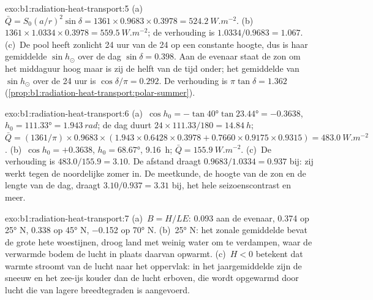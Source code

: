 \begin{solution}{exo:b1:radiation-heat-transport:5}
(a)~$\bar Q = S_0(a/r)^2\sin\delta = 1361 \times 0.9683 \times 0.3978 =
\qty{524.2}{W.m^{-2}}$. (b)~$1361 \times 1.0334 \times 0.3978 =
\qty{559.5}{W.m^{-2}}$; de verhouding is $1.0334/0.9683 = 1.067$. (c)~De pool heeft
zonlicht 24 uur van de 24 op een constante hoogte, dus is haar gemiddelde $\sin h_\odot$ over
de dag $\sin\delta = 0.398$. Aan de evenaar staat de zon om het middaguur hoog maar is zij de helft van de tijd onder; het gemiddelde van $\sin h_\odot$ over de 24 uur is $\cos\delta/\pi =
0.292$. De verhouding is $\pi\tan\delta = 1.362$
(\cref{prop:b1:radiation-heat-transport:polar-summer}).
\end{solution}

\begin{solution}{exo:b1:radiation-heat-transport:6}
(a)~$\cos h_0 = -\tan\ang{40}\tan\ang{23.44} = -0.3638$, $h_0 = \ang{111.33} =
\qty{1.943}{rad}$; de dag duurt $24 \times 111.33/180 = \qty{14.84}{h}$; $\bar Q =
(1361/\pi) \times 0.9683 \times (1.943 \times 0.6428 \times 0.3978 + 0.7660 \times
0.9175 \times 0.9315) = \qty{483.0}{W.m^{-2}}$. (b)~$\cos h_0 = +0.3638$, $h_0 =
\ang{68.67}$, \qty{9.16}{h}; $\bar Q = \qty{155.9}{W.m^{-2}}$. (c)~De verhouding is
$483.0/155.9 = 3.10$. De afstand draagt $0.9683/1.0334 = 0.937$ bij: zij werkt tegen de noordelijke zomer in. De meetkunde, de hoogte van de zon en de lengte van de dag, draagt $3.10/0.937 = 3.31$ bij, het hele seizoenscontrast en meer.
\end{solution}

\begin{solution}{exo:b1:radiation-heat-transport:7}
(a)~$B = H/LE$: \num{0.093} aan de evenaar, \num{0.374} op \ang{25} N,
\num{0.338} op \ang{45} N, \num{-0.152} op \ang{70} N. (b)~\ang{25} N: het zonale
gemiddelde bevat de grote hete woestijnen, droog land met weinig water om te verdampen, waar de
verwarmde bodem de lucht in plaats daarvan opwarmt. (c)~$H < 0$ betekent dat warmte stroomt van de
lucht naar het oppervlak: in het jaargemiddelde zijn de sneeuw en het zee-ijs kouder dan de lucht
erboven, die wordt opgewarmd door lucht die van lagere breedtegraden is aangevoerd.
\end{solution}

